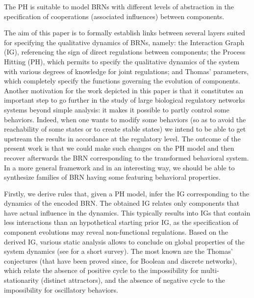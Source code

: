 The PH is suitable to model BRNs with different levels of abstraction in the specification of
cooperations (associated influences) between components.   

\medskip

The aim of this paper is to formally establish links between several layers suited for specifying the
qualitative dynamics of BRNs, namely:
the Interaction Graph (IG), referencing the sign of direct regulations between components;
the Process Hitting (PH), which permits to specify the qualitative dynamics of the system with
various degrees of knowledge for joint regulations;
and Thomas' parameters, which completely specify the functions governing the evolution of
components.
Another motivation for the work depicted in this paper is that it constitutes an important step
to go further in the study of large biological regulatory networks systems beyond simple analysis:
it makes it possible to partly control some behaviors.
Indeed, when one wants to modify some behaviors
(\eg so as to avoid the reachability of some states or to create stable states)
we intend to be able to get upstream the results in accordance at the regulatory level.
The outcome of the present work is that we could make such changes on the PH model
and then recover afterwards the BRN corresponding to the transformed behavioral system.
In a more general framework and in an interesting way,
we should be able to synthesize families of BRN having some featuring behavioral properties.

Firstly, we derive rules that, given a PH model, infer the IG corresponding to the dynamics of the
encoded BRN.
The obtained IG relates only components that have actual influence in the dynamics.
This typically results into IGs that contain less interactions than an hypothetical starting prior
IG, as the specification of component evolutions may reveal non-functional regulations.
Based on the derived IG, various static analysis allows to conclude on global properties
of the system dynamics (see \cite{PR11-SASB} for a short survey).
The most known are the Thomas' conjectures (that have been proved since,
\eg \cite{RRT08,RiCo07,Richard2010378}
for Boolean and discrete networks),
which relate the absence of
positive cycle to the impossibility for multi-stationarity (distinct attractors),
and the absence of negative cycle to the impossibility for oscillatory behaviors.

